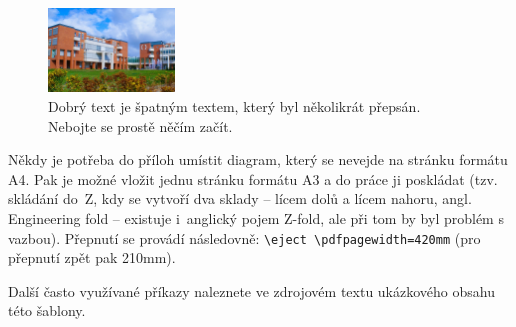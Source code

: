 \begin{figure}[hbt]
	\centering
	\includegraphics[width=0.3\textwidth]{obrazky/uhk.jpg}
	\caption{Dobrý text je špatným textem, který byl několikrát přepsán. Nebojte se prostě něčím začít.}
	\label{keepCalm}
\end{figure}

Někdy je potřeba do příloh umístit diagram, který se nevejde na stránku formátu A4. Pak je možné vložit jednu stránku formátu A3 a do práce ji poskládat (tzv. skládání do~Z, kdy se vytvoří dva sklady -- lícem dolů a lícem nahoru, angl. Engineering fold -- existuje i~anglický pojem Z-fold, ale při tom by byl problém s vazbou). Přepnutí se provádí následovně: \texttt{\textbackslash{}eject \textbackslash{}pdfpagewidth=420mm} (pro přepnutí zpět pak 210mm).

Další často využívané příkazy naleznete ve zdrojovém textu ukázkového obsahu této šablony.


